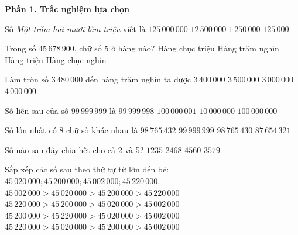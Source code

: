 \textbf{Phần 1. Trắc nghiệm lựa chọn}

\begin{ex} %
Số \textit{Một trăm hai mươi lăm triệu} viết là
\choice
{\True $125\,000\,000$}
{$12\,500\,000$}
{$1\,250\,000$}
{$125\,000$}
\end{ex}

\begin{ex} %
Trong số $45\,678\,900$, chữ số 5 ở hàng nào?
\choice
{Hàng chục triệu}
{Hàng trăm nghìn}
{\True Hàng triệu}
{Hàng chục nghìn}
\end{ex}

\begin{ex} %
Làm tròn số $3\,480\,000$ đến hàng trăm nghìn ta được
\choice
{$3\,400\,000$}
{\True $3\,500\,000$}
{$3\,000\,000$}
{$4\,000\,000$}
\end{ex}

\begin{ex} %
Số liền sau của số $99\,999\,999$ là
\choice
{$99\,999\,998$}
{$100\,000\,001$}
{$10\,000\,000$}
{\True $100\,000\,000$}
\end{ex}

\begin{ex} %
Số lớn nhất có 8 chữ số khác nhau là
\choice
{\True $98\,765\,432$}
{$99\,999\,999$}
{$98\,765\,430$}
{$87\,654\,321$}
\end{ex}

\begin{ex} %
Số nào sau đây chia hết cho cả 2 và 5?
\choice
{$1235$}
{$2468$}
{\True $4560$}
{$3579$}
\end{ex}

\begin{ex} %
Sắp xếp các số sau theo thứ tự từ lớn đến bé: $45\,020\,000; 45\,200\,000; 45\,002\,000; 45\,220\,000$.
\choice
{$45\,002\,000 > 45\,020\,000 > 45\,200\,000 > 45\,220\,000$}
{\True $45\,220\,000 > 45\,200\,000 > 45\,020\,000 > 45\,002\,000$}
{$45\,200\,000 > 45\,220\,000 > 45\,020\,000 > 45\,002\,000$}
{$45\,220\,000 > 45\,020\,000 > 45\,200\,000 > 45\,002\,000$}
\end{ex}

